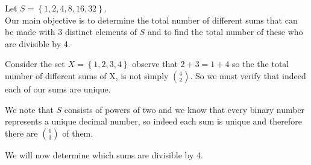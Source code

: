 \documentclass[11pt]{article}
\begin{document}
Let \(S = \left\{ 1, 2, 4, 8, 16, 32 \right\} \). \\
Our main objective is to determine the total number of different sums that can be made with 3 distinct elements of \(S\) and to find the total number of these who are divisible by 4.

Consider the set \(X = \left\{ 1, 2, 3, 4 \right\} \) observe that \(2 + 3= 1 + 4\) so the the total number of different sums of X, is not simply \(\binom{4}{2} \). So we must verify that indeed each of our sums are unique.

We note that \(S\) consists of powers of two and we know that every binary number represents a unique decimal number, so indeed each sum is unique and therefore there are \(\binom{6}{3} \) of them. 

We will now determine which sums are divisible by 4. 
\end{document}

